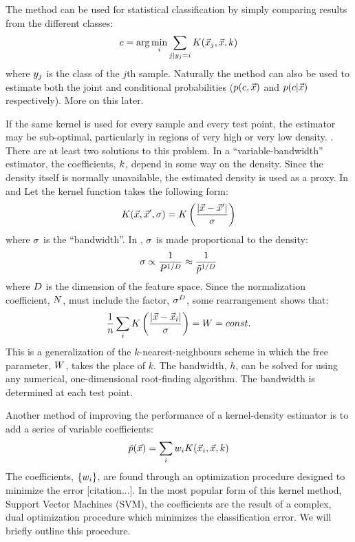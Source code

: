 \documentclass[11pt]{article}
\begin{document}
The method can be used for statistical classification by simply comparing
results from the different classes:
\begin{equation}
	c = \arg \min_i \sum_{j|y_j = i} K(\vec {x}_j, \vec {x}, k)
\end{equation}
where $y_j$ is the class of the $j$th sample. Naturally the method can also
be used to estimate both the joint and conditional probabilities 
($p(c, \vec x)$ and $p(c |\vec x)$ respectively). 
More on this later.

If the same kernel is used for every sample and every test point, the estimator
may be sub-optimal, particularly in regions of very high or very low density.
\citep{Terrell_Scott1992, Mills2011}.
There are at least two solutions to this problem.
In a ``variable-bandwidth'' estimator, the coefficients, $k$, depend in some
way on the density. Since the density itself is normally unavailable, the
estimated density is used as a proxy. In \citet{Terrell_Scott1992} and
\citet{Mills2011} 
Let the kernel function takes the following form:
\begin{equation}
	K(\vec {x}, \vec {x}^\prime, \sigma) = K \left (\frac{|\vec {x} - \vec {x}^\prime|}{\sigma} \right )
\end{equation}
where $\sigma$ is the ``bandwidth''. 
In \citet{Mills2011}, $\sigma$ is made proportional to the density:
\begin{equation}
	\sigma \propto \frac{1}{P^{1/D}} \approx \frac{1}{\tilde p^{1/D}}
\end{equation}
where $D$ is the dimension of the feature space.
Since the normalization coefficient, $N$, must include the factor,
${\sigma^D}$, some rearrangement shows that:
\begin{equation}
	\frac{1}{n} \sum_i K \left (\frac{|\vec {x} - \vec {x}_i|}{\sigma} \right ) = W = const.
\end{equation}
This is a generalization of the $k$-nearest-neighbours scheme in which the
free parameter, $W$, takes the place of $k$. \citep{Mills2009, Mills2011}
The bandwidth, $h$, can be solved
for using any numerical, one-dimensional root-finding algorithm.
The bandwidth is determined at each test point.

Another method of improving the performance of a kernel-density estimator
is to add a series of variable coefficients:
\begin{equation}
	\tilde p(\vec {x}) = \sum_i w_i K(\vec {x}_i, \vec {x}, k)
\end{equation}
The coefficients, $\lbrace w_i \rbrace$, are found through an optimization
procedure designed to minimize the error [citation...]. In the most popular
form of this kernel method, Support Vector Machines (SVM), the coefficients
are the result of a complex, dual optimization procedure which minimizes
the classification error. We will briefly outline this procedure.
\end{document}
